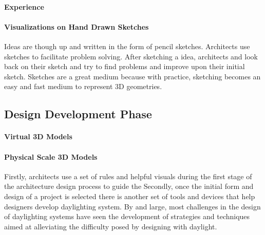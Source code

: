     \paragraph{Experience}


    \paragraph{Visualizations on Hand Drawn Sketches}

    Ideas are though up and written in the form of pencil sketches.
    Architects use sketches to facilitate problem solving. 
    After sketching a idea, architects and look back on their sketch and try to find problems and improve upon their initial sketch.
    Sketches are a great medium because with practice, sketching becomes an easy and fast medium to represent 3D geometries\cite{Suwa}.

  \subsection{Design Development Phase}

    \paragraph{Virtual 3D Models}
    \paragraph{Physical Scale 3D Models}



  Firstly, architects use a set of rules and helpful visuals during the first stage of the architecture design process to guide the 
  Secondly, once the initial form and design of a project is selected there is another set of tools and devices that help designers develop daylighting system.
  By and large, most challenges in the design of daylighting systems have seen the development of strategies and techniques aimed at alleviating the difficulty posed by designing with daylight.\\

